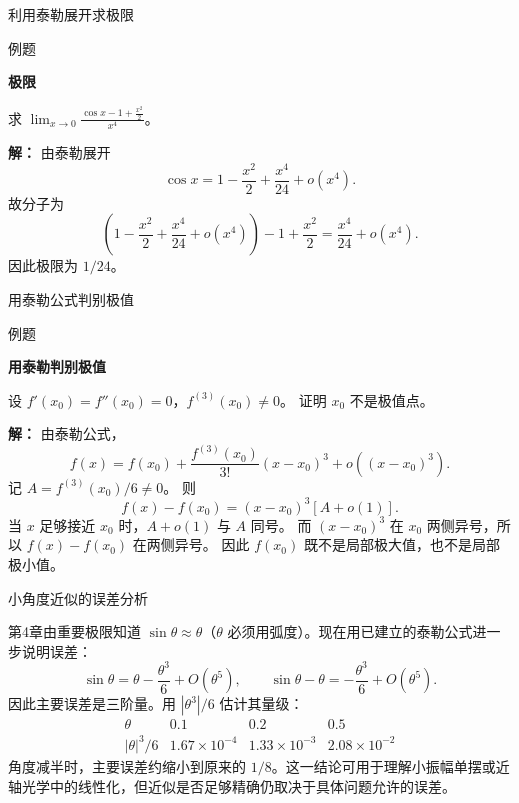 \documentclass[aspectratio=169,10pt,fontset=fandol]{ctexbeamer}
\begin{document}
\begin{frame}[t,fragile]{利用泰勒展开求极限}
\normalsize
\begin{block}{例题}
{\normalsize
\textbf{极限}\par

求 $\displaystyle\lim_{x\to0}\frac{\cos x-1+\frac{x^2}{2}}{x^4}$。

}
\end{block}
\pause
{\normalsize
\textbf{解：}
由泰勒展开
\[
\cos x=1-\frac{x^2}{2}+\frac{x^4}{24}+o(x^4).
\]
故分子为
\[
\left(1-\frac{x^2}{2}+\frac{x^4}{24}+o(x^4)\right)-1+\frac{x^2}{2}
=\frac{x^4}{24}+o(x^4).
\]
因此极限为 $1/24$。

}
\end{frame}
\begin{frame}[t,fragile]{用泰勒公式判别极值}
\normalsize
\begin{block}{例题}
{\normalsize
\textbf{用泰勒判别极值}\par

设 $f'(x_0)=f''(x_0)=0$，$f^{(3)}(x_0)\neq0$。 证明 $x_0$ 不是极值点。

}
\end{block}
\pause
{\normalsize
\textbf{解：}
由泰勒公式，
\[
f(x)=f(x_0)+\frac{f^{(3)}(x_0)}{3!}(x-x_0)^3+o((x-x_0)^3).
\]
记 $A=f^{(3)}(x_0)/6\neq0$。 则
\[
f(x)-f(x_0)=(x-x_0)^3[A+o(1)].
\]
当 $x$ 足够接近 $x_0$ 时，$A+o(1)$ 与 $A$ 同号。 而 $(x-x_0)^3$ 在 $x_0$ 两侧异号，所以 $f(x)-f(x_0)$ 在两侧异号。 因此 $f(x_0)$ 既不是局部极大值，也不是局部极小值。

}
\end{frame}
\begin{frame}[t,fragile]{小角度近似的误差分析}
\normalsize
{\normalsize
\begin{application}
第4章由重要极限知道 $\sin\theta\approx\theta$（$\theta$ 必须用弧度）。现在用已建立的泰勒公式进一步说明误差：
\[
\sin\theta=\theta-\frac{\theta^3}{6}+O(\theta^5),
\qquad
\sin\theta-\theta=-\frac{\theta^3}{6}+O(\theta^5).
\]
因此主要误差是三阶量。用 $|\theta^3|/6$ 估计其量级：
\[
\begin{array}{c|ccc}
\theta&0.1&0.2&0.5\\ \hline
|\theta|^3/6&1.67\times10^{-4}&1.33\times10^{-3}&2.08\times10^{-2}
\end{array}
\]
角度减半时，主要误差约缩小到原来的 $1/8$。这一结论可用于理解小振幅单摆或近轴光学中的线性化，但近似是否足够精确仍取决于具体问题允许的误差。
\end{application}
}
\end{frame}
\end{document}
